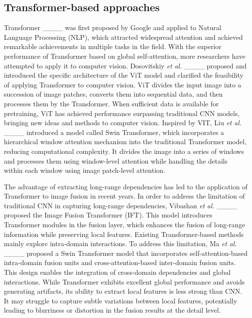 \subsection{Transformer-based approaches}
Transformer ____ was first proposed by Google and applied to Natural Language Processing (NLP), which attracted widespread attention and achieved remarkable achievements in multiple tasks in the field.
With the superior performance of Transformer based on global self-attention, more researchers have attempted to apply it to computer vision.
Dosovitskiy \textit{et al.} ____ proposed and introduced the specific architecture of the ViT model and clarified the feasibility of applying Transformer to computer vision.
ViT divides the input image into a succession of image patches, converts them into sequential data, and then processes them by the Transformer.
When sufficient data is available for pretraining, ViT has achieved performance surpassing traditional CNN models, bringing new ideas and methods to computer vision.
Inspired by VIT, Liu \textit{et al.} ____ introduced a model called Swin Transformer, which incorporates a hierarchical window attention mechanism into the traditional Transformer model, reducing computational complexity.
It divides the image into a series of windows and processes them using window-level attention while handling the details within each window using image patch-level attention.

The advantage of extracting long-range dependencies has led to the application of Transformer to image fusion in recent years.
In order to address the limitation of traditional CNN in capturing long-range dependencies, Vibashan \textit{et al.} ____ proposed the Image Fusion Transformer (IFT).
This model introduces Transformer modules in the fusion layer, which enhances the fusion of long-range information while preserving local features.
Existing Transformer-based methods mainly explore intra-domain interactions.
To address this limitation, Ma \textit{et al.} ____ proposed a Swin Transformer model that incorporates self-attention-based intra-domain fusion units and cross-attention-based inter-domain fusion units.
This design enables the integration of cross-domain dependencies and global interactions.
While Transformer exhibits excellent global performance and avoids generating artifacts, its ability to extract local features is less strong than CNN.
It may struggle to capture subtle variations between local features, potentially leading to blurriness or distortion in the fusion results at the detail level.


